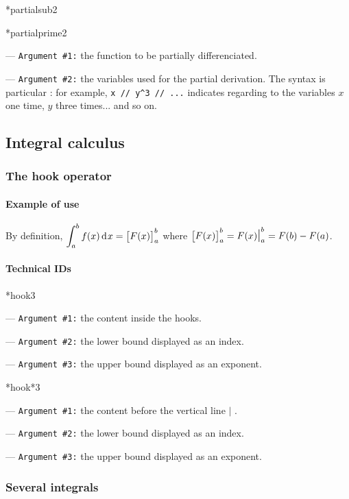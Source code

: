 \documentclass[12pt,a4paper]{article}
\makeatletter
\newcommand\IDmacro{\@ifstar{\@IDmacroStar}{\@IDmacroNoStar}}
\newcommand\@IDmacroNoStar[3]{%
        \texttt{%
        	\textbackslash#1%
        	\IfStrEq{#2}{0}{}{%
        		\,\,[#2 Option%
				\IfStrEq{#2}{1}{}{s}]%
			}%
    	    \,\,(#3 Argument%
				\IfStrEq{#3}{1}{}{s})%
	   	}
        \immediate\write\tempfile{macro@#1@#2@#3}%
    }
\newcommand\@IDmacroStar[2]{%
        \@IDmacroNoStar{#1}{0}{#2}%
    }
\newcommand\@IDoptarg[2]{%
    	\vspace{0.5em}
		--- \texttt{#1 \##2:}%
	}
\newcommand\IDarg[1]{%
    	\@IDoptarg{Argument}{#1}%
	}
\makeatother
\begin{document}
\bigskip


\IDmacro*{partialsub}{2}

\IDmacro*{partialprime}{2}

\IDarg{1} the function to be partially differenciated.

\IDarg{2} the variables used for the partial derivation. The syntax is particular : for example, \verb+x // y^3 // ...+ indicates regarding to the variables $x$ one time, $y$ three times... and so on.




\subsection{Integral calculus}

    \subsubsection{The hook operator}

		\paragraph{Example of use}

\begin{tcblisting}{}
By definition, $\displaystyle \int_{a}^{b} f(x) \dd{x} = \hook{F(x)}{a}{b}$
where $\hook{F(x)}{a}{b} = \hook*{F(x)}{a}{b} = F(b) - F(a)$.
\end{tcblisting}


		\paragraph{Technical IDs}

\IDmacro*{hook}{3}

\IDarg{1} the content inside the hooks.

\IDarg{2} the lower bound displayed as an index.

\IDarg{3} the upper bound displayed as an exponent.


\bigskip


\IDmacro*{hook*}{3}

\IDarg{1} the content before the vertical line $\vert$ .

\IDarg{2} the lower bound displayed as an index.

\IDarg{3} the upper bound displayed as an exponent.



    \subsubsection{Several integrals}
\end{document}
